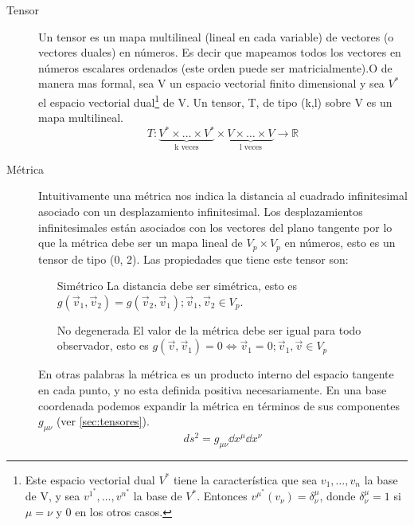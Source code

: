 \documentclass[../Main.tex]{subfiles}
\begin{document}
\begin{description}
    \item [Tensor]
    Un tensor es un mapa multilineal (lineal en cada variable) de vectores (o vectores duales) en números. Es decir que mapeamos todos los vectores en números escalares ordenados (este orden puede ser matricialmente).O de manera mas formal, sea V un espacio vectorial finito dimensional y sea $V^{*}$ el espacio vectorial dual\footnote{Este espacio vectorial dual $V^{*}$ tiene la característica que sea $v_{1}, \dots, v_{n}$ la base de V, y sea $v^{1^{*}}, \dots, v^{n^{*}}$ la base de $V^{*}$. Entonces $v^{\mu^{*}}(v_{\nu})=\delta^{\mu}_{\nu}$, donde $\delta^{\mu}_{\nu}=1$ si $\mu=\nu$ y 0 en los otros casos.} de V. Un tensor, T, de tipo (k,l) sobre V es un mapa multilineal.
    \begin{equation}
        T: \underbrace{V^{*}\times\dots\times V^{*}}_\text{k veces} \times \underbrace{V \times \dots \times V}_\text{l veces} \rightarrow \mathbb{R}
    \end{equation}
    \item [Métrica]
    Intuitivamente una métrica nos indica la distancia al cuadrado infinitesimal asociado con un desplazamiento infinitesimal. Los desplazamientos infinitesimales están asociados con los vectores del plano tangente por lo que la métrica debe ser un mapa lineal de $V_{p}\times V_{p}$ en números, esto es un tensor de tipo (0, 2). Las propiedades que tiene este tensor son:
    \begin{itemize}
        \item [Simétrico]
        La distancia debe ser simétrica, esto es $g(\vec{v}_{1}, \vec{v}_{2})=g(\vec{v}_{2}, \vec{v}_{1}); \vec{v}_{1}, \vec{v}_{2} \in V_{p}$.
        \item [No degenerada]
        El valor de la métrica debe ser igual para todo observador, esto es $g(\vec{v},\vec{v}_{1})=0 \Leftrightarrow \vec{v}_{1}=0; \vec{v}_{1}, \vec{v} \in V_{p}$
    \end{itemize}
    En otras palabras la métrica es un producto interno del espacio tangente en cada punto, y no esta definida positiva necesariamente. En una base coordenada podemos expandir la métrica en términos de sus componentes $g_{\mu\nu}$ (ver \ref{sec:tensores}).
    \begin{equation}
        ds^{2} = g_{\mu\nu} \dd{x}^{\mu}\dd{x}^{\nu}
    \end{equation}
\end{description}
\end{document}
